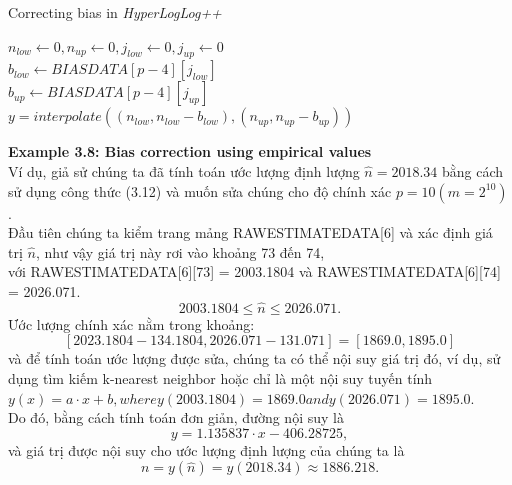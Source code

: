 \documentclass[a4paper,13pt]{article}
\theoremstyle{mytheor}
\begin{document}
\begin{algorithm}[H]
    \vspace{0.25cm}
    \DontPrintSemicolon
    \LinesNumberedHidden
    \caption[]{Correcting bias in \textit{HyperLogLog++}}
    $n_{low} \gets 0, n_{up} \gets 0, j_{low} \gets 0, j_{up} \gets 0 $\\
    $b_{low} \gets BIASDATA[p-4][j_{low}]$\\
    $b_{up} \gets BIASDATA[p-4][j_{up}]$\\
    $y = interpolate\left(\left(n_{low}, n_{low} - b_{low}\right), \left(n_{up}, n_{up} - b_{up
    }\right)\right)$\\
    \vspace{0.25cm}
\end{algorithm}
\begin{mdframed}
    \vspace{0.25cm}
    \textbf{Example 3.8: Bias correction using empirical values}\\
    Ví dụ, giả sử chúng ta đã tính toán ước lượng định lượng $\hat{n} = 2018.34$ bằng cách sử dụng công thức (3.12) và muốn sửa chúng cho 
    độ chính xác $p = 10 (m = 2^{10})$.\\
    Đầu tiên chúng ta kiểm trang mảng RAWESTIMATEDATA[6] và xác định giá trị $\hat{n}$, như vậy giá trị này rơi vào khoảng 73 đến 74,\\ với RAWESTIMATEDATA[6][73] = 2003.1804 và
    RAWESTIMATEDATA[6][74] = 2026.071.
    \[2003.1804 \le \hat{n} \le 2026.071.\]
    Ước lượng chính xác nằm trong khoảng:
    \[\left[2023.1804 - 134.1804, 2026.071 - 131.071\right] = \left[1869.0, 1895.0\right]\]
    và để tính toán ước lượng được sửa, chúng ta có thể nội suy giá trị đó, ví dụ, sử dụng tìm kiếm k-nearest neighbor hoặc chỉ là một nội suy tuyến tính\\
    $y(x) = a \cdot x + b, where y(2003.1804) = 1869.0 and y(2026.071) = 1895.0.$\\
    Do đó, bằng cách tính toán đơn giản, đường nội suy là
    \[y = 1.135837 \cdot x - 406.28725,\]
    và giá trị được nội suy cho ước lượng định lượng của chúng ta là
    \[n = y(\hat{n}) = y(2018.34) \approx 1886.218.\]
    
\end{mdframed}
\end{document}
